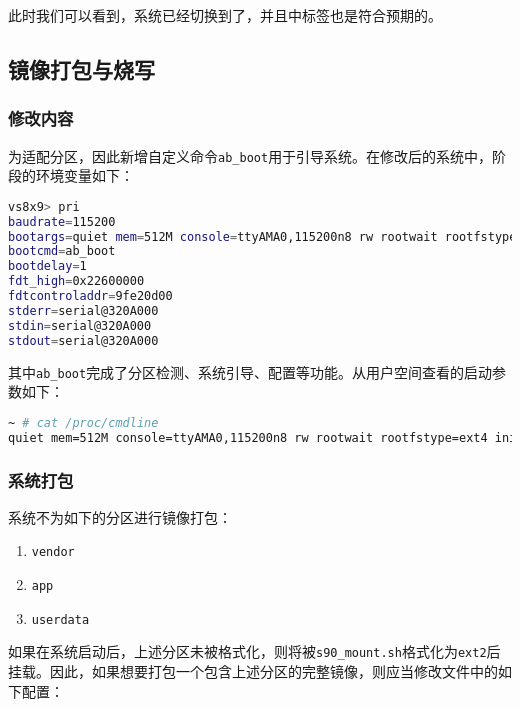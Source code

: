 \documentclass[UTF8]{ctexart}
\newcommand{\code}[1]{\colorbox{gray!10}{\lstinline[style=inlinecode]|#1|}}
\begin{document}
\noindent 此时我们可以看到，系统已经切换到了，并且中标签也是符合预期的。

\subsection{镜像打包与烧写}

\subsubsection{修改内容}

为适配分区，因此新增自定义命令\code{ab_boot}用于引导系统。在修改后的系统中，阶段的环境变量如下：

\begin{lstlisting}[language=sh]
vs8x9> pri
baudrate=115200
bootargs=quiet mem=512M console=ttyAMA0,115200n8 rw rootwait rootfstype=ext4 init=/linuxrc
bootcmd=ab_boot
bootdelay=1
fdt_high=0x22600000
fdtcontroladdr=9fe20d00
stderr=serial@320A000
stdin=serial@320A000
stdout=serial@320A000      
\end{lstlisting}

\noindent 其中\code{ab_boot}完成了分区检测、系统引导、配置等功能。从用户空间查看的启动参数如下：

\begin{lstlisting}[language=sh]
~ # cat /proc/cmdline 
quiet mem=512M console=ttyAMA0,115200n8 rw rootwait rootfstype=ext4 init=/linuxrc root=/dev/mmcblk0p9 rootfstype=ext4 rw rootwait blkdevparts=mmcblk0:512K(vs_aov),512K(env),7M(bootloader),1M(misc),2M(dtb_a),2M(dtb_b),20M(kernel_a),20M(kernel_b),512M(rootfs_a),512M(rootfs_b),32M(vendor),256M(app),-(userdata)
\end{lstlisting}

\subsubsection{系统打包}

系统不为如下的分区进行镜像打包：

\begin{enumerate}
    \item \code{vendor}
    \item \code{app}
    \item \code{userdata}
\end{enumerate}

\noindent 如果在系统启动后，上述分区未被格式化，则将被\code{s90_mount.sh}格式化为\code{ext2}后挂载。因此，如果想要打包一个包含上述分区的完整镜像，则应当修改文件中的如下配置：
\end{document}
